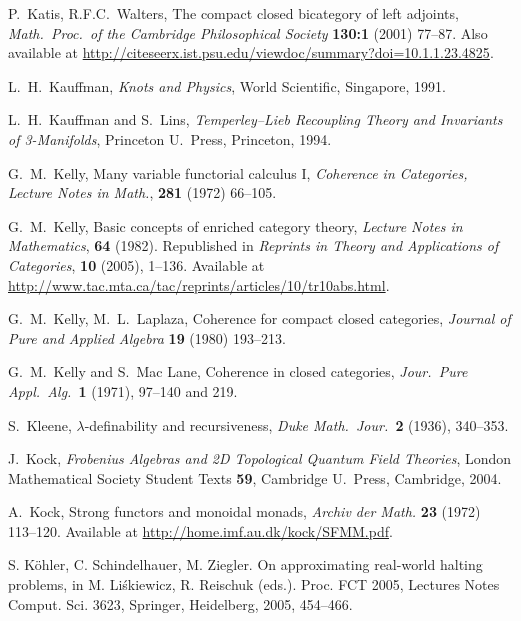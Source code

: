 \documentclass[12pt,twoside,openright]{report}
\begin{document}
\begin{thebibliography}{99}
 P.\ Katis, R.F.C.\ Walters, The compact closed bicategory of left adjoints, \textsl{Math.\ Proc.\ of the Cambridge Philosophical Society} \textbf{130:1} (2001) 77--87.  Also available at \href{http://citeseerx.ist.psu.edu/viewdoc/summary?doi=10.1.1.23.4825}{http://citeseerx.ist.psu.edu/viewdoc/summary?doi=10.1.1.23.4825}.

L.\ H.\ Kauffman, {\sl Knots and Physics}, World Scientific, Singapore, 1991.

L.\ H.\ Kauffman and S.\ Lins, {\sl Temperley--Lieb Recoupling Theory and Invariants of 3-Manifolds}, Princeton U.\ Press, Princeton, 1994.

 G.\ M.\ Kelly, Many variable functorial calculus I, \textsl{Coherence in Categories, Lecture Notes in Math.}, \textbf{281} (1972) 66--105.

 G.\ M.\ Kelly, Basic concepts of enriched category theory, \textsl{Lecture Notes in Mathematics}, \textbf{64} (1982).  Republished in \textsl{Reprints in Theory and Applications of Categories}, \textbf{10} (2005), 1--136.  Available at \href{http://www.tac.mta.ca/tac/reprints/articles/10/tr10abs.html}{http://www.tac.mta.ca/tac/reprints/articles/10/tr10abs.html}.

 G.\ M.\ Kelly, M.\ L.\ Laplaza, Coherence for compact closed categories, \textsl{Journal of Pure and Applied Algebra} \textbf{19} (1980) 193--213.

 G.\ M.\ Kelly and S.\ Mac Lane, Coherence in closed categories, {\sl Jour.\ Pure Appl.\ Alg.\ }{\bf 1} (1971), 97--140
and 219.

S.\ Kleene, $\lambda$-definability and recursiveness,
{\sl Duke Math.\ Jour.\ }{\bf 2} (1936), 340--353. 

J.\ Kock, \textsl{Frobenius Algebras and 2{D} Topological Quantum Field Theories}, London Mathematical Society Student Texts \textbf{59}, Cambridge U.\ Press, Cambridge, 2004.

 A.\ Kock, Strong functors and monoidal monads, \textsl{Archiv der Math.} \textbf{23} (1972) 113--120.  Available at \href{http://home.imf.au.dk/kock/SFMM.pdf}{http://home.imf.au.dk/kock/SFMM.pdf}.

  S. K\"ohler, C. Schindelhauer, M. Ziegler. On approximating real-world halting problems, in M. Li\'skiewicz, R. Reischuk (eds.). Proc. FCT 2005, Lectures Notes Comput. Sci. 3623, Springer, Heidelberg, 2005, 454--466.


\end{thebibliography}
\end{document}
